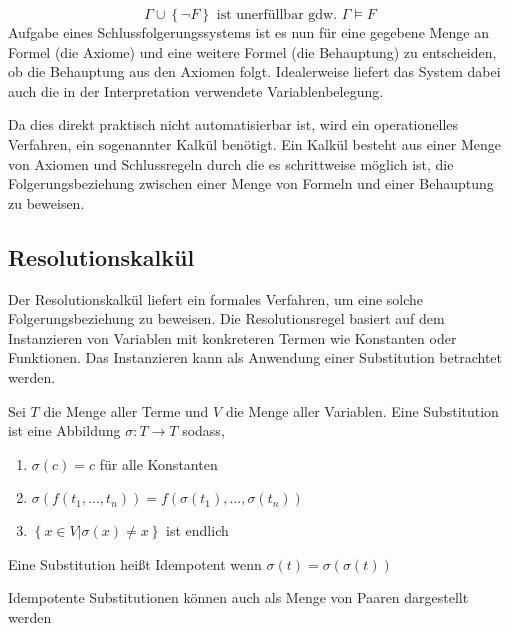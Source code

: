 \begin{equation}
  \Gamma \cup \left \{ \neg F \right \} \text{ ist unerfüllbar gdw. } \Gamma \models F
\end{equation}
\noindent
Aufgabe eines Schlussfolgerungssystems ist es nun für eine gegebene Menge an Formel (die Axiome) und eine weitere Formel (die Behauptung) zu entscheiden, ob die Behauptung aus den Axiomen folgt. Idealerweise liefert das System dabei auch die in der Interpretation verwendete Variablenbelegung.

Da dies direkt praktisch nicht automatisierbar ist, wird ein operationelles Verfahren, ein sogenannter Kalkül benötigt. Ein Kalkül besteht aus einer Menge von Axiomen und Schlussregeln durch die es schrittweise möglich ist, die Folgerungsbeziehung zwischen einer Menge von Formeln und einer Behauptung zu beweisen.

\subsection{Resolutionskalkül}\label{res}
Der Resolutionskalkül liefert ein formales Verfahren, um eine solche Folgerungsbeziehung zu beweisen. Die Resolutionsregel basiert auf dem Instanzieren von Variablen mit konkreteren Termen wie Konstanten oder Funktionen. Das Instanzieren kann als Anwendung einer Substitution betrachtet werden. 

\begin{leftbar}
  \begin{definition}
    \newline
    Sei $T$ die Menge aller Terme und $V$ die Menge aller Variablen. Eine Substitution ist eine Abbildung $\sigma : T \rightarrow T$ sodass,

    \begin{enumerate}
    \item $\sigma(c) = c$ für alle Konstanten
    \item $\sigma(f(t_1,...,t_n)) = f(\sigma(t_1),...,\sigma(t_n))$
    \item $\left \{ x \in V | \sigma(x) \neq x \right \}$ ist endlich
    \end{enumerate}
    \newline
    Eine Substitution heißt Idempotent wenn $\sigma(t) = \sigma(\sigma(t))$
  \end{definition}
\end{leftbar}
\noindent
Idempotente Substitutionen können auch als Menge von Paaren dargestellt werden

